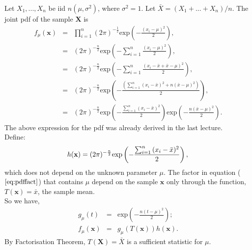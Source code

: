\documentclass[a4paper,english,12pt]{article}
\newcommand{\bx}{\mathbf{x}}
\newcommand{\bX}{\mathbf{X}}
\begin{document}
\begin{exmp} 
 \label{ex:norml}
Let $X_1,...,X_n$ be iid $n(\mu, \sigma^2)$, where $\sigma^2=1$. Let $\bar{X}=(X_1+...+X_n)/n$. The joint pdf of the sample $\bX$ is
\begin{eqnarray}
f_\mu(\bx) &=& \prod_{i=1}^{n}{(2\pi)^{-\frac{1}{2}} \text{exp}\left(-\frac{(x_i-\mu)^2}{2}\right)}, \nonumber \\
&=& (2\pi)^{-\frac{n}{2}}\text{exp}\left(-\sum_{i=1}^{n}{\frac{(x_i-\mu)^2}{2}}\right), \nonumber \\
&=& (2\pi)^{-\frac{n}{2}}\text{exp}\left(-\sum_{i=1}^{n}{\frac{(x_i-\bar{x}+\bar{x}-\mu)^2}{2}}\right), \nonumber \\
&=& (2\pi)^{-\frac{n}{2}}\text{exp}\left(-\frac{\left(\sum_{i=1}^{n}{(x_i-\bar{x})^2}+n(\bar{x}-\mu)^2\right)}{2}\right), \nonumber \\
&=& (2\pi)^{-\frac{n}{2}}\text{exp}\left(-\frac{\sum_{i=1}^{n}{(x_i-\bar{x})^2}}{2}\right)\text{exp}\left(-\frac{n(\bar{x}-\mu)^2}{2}\right). \label{eq:pdffact}
\end{eqnarray}
The above expression for the pdf was already derived in the last lecture. \\
Define:
\begin{equation*}
h(\bx)=(2\pi)^{-\frac{n}{2}}\text{exp}\left(-\frac{\sum_{i=1}^{n}{(x_i-\bar{x})^2}}{2}\right),\\
\end{equation*}
which does not depend on the unknown parameter $\mu$. The factor in equation ($\ref{eq:pdffact}$) that contains $\mu$ depend on the sample $\bx$ only through the function, $T(\bx)=\bar{x}$, the sample mean.\\
So we have, 
\begin{eqnarray}
g_\mu(t) &=& \text{exp}\left(-\frac{n(t-\mu)^2}{2}\right); \\
f_\mu(\bx)&=& g_\mu(T(\bx))h(\bx).
\end{eqnarray}
By Factorisation Theorem, $T(\bX)=\bar{X}$ is a sufficient statistic for $\mu$.
\end{exmp}
\end{document}

